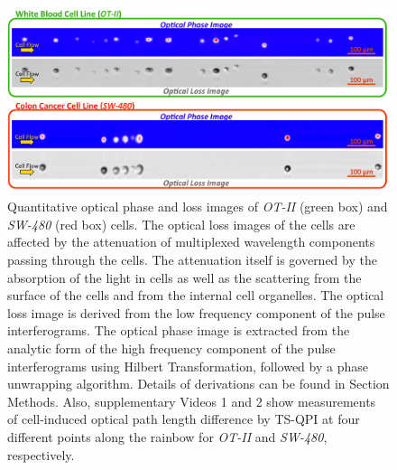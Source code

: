 \documentclass[aps,pra,reprint,superscriptaddress]{revtex4-1}
\begin{document}
\begin{figure}
\end{figure}

\begin{figure}
\includegraphics[scale=0.2]{Figure2DImage.jpg}
\caption{\label{fig:2DImage} Quantitative optical phase and loss images of \textit{OT-II} (green box) and \textit{SW-480} (red box) cells. The optical loss images of the cells are affected by the attenuation of multiplexed wavelength components passing through the cells. The attenuation itself is governed by the absorption of the light in cells as well as the scattering from the surface of the cells and from the internal cell organelles. The optical loss image is derived from the low frequency component of the pulse interferograms. The optical phase image is extracted from the analytic form of the high frequency component of the pulse interferograms using Hilbert Transformation, followed by a phase unwrapping algorithm. Details of derivations can be found in Section Methods. Also, supplementary Videos 1 and 2 show measurements of cell-induced optical path length difference by TS-QPI at four different points along the rainbow for \textit{OT-II} and \textit{SW-480}, respectively.}
\end{figure}
\end{document}
